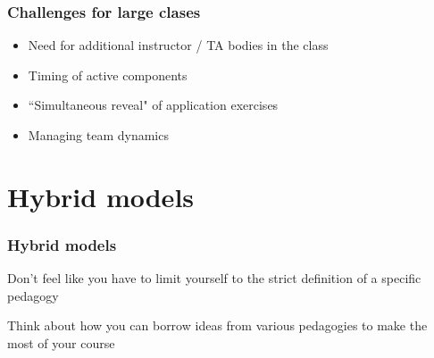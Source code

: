 \documentclass{beamer}
\begin{document}

\begin{frame}
\frametitle{Challenges for large clases}

\begin{itemize}

\item Need for additional instructor / TA bodies in the class

\item Timing of active components

\item ``Simultaneous reveal" of application exercises

\item Managing team dynamics

\end{itemize}

\end{frame}


\section{Hybrid models}


\begin{frame}
\frametitle{Hybrid models}

\vfill

Don't feel like you have to limit yourself to the strict definition of a specific pedagogy

\vfill

Think about how you can borrow ideas from various pedagogies to make the most of your course

\end{frame}


\end{document}
